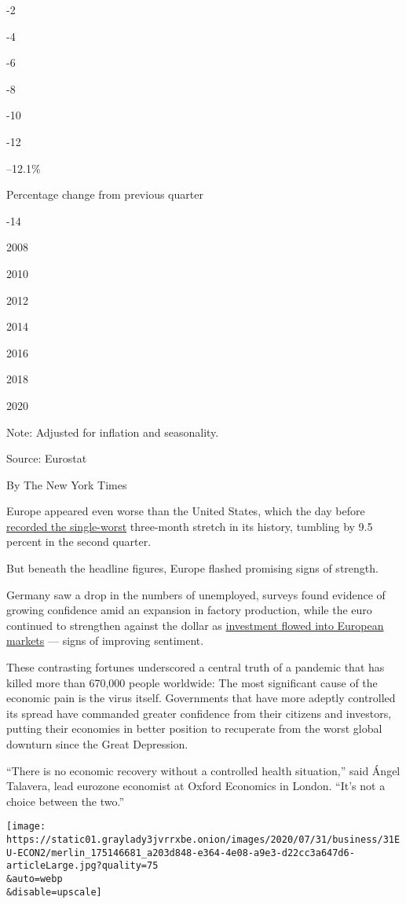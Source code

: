 -2

-4

-6

-8

-10

-12

--12.1\%

Percentage change from previous quarter

-14

2008

2010

2012

2014

2016

2018

2020

Note: Adjusted for inflation and seasonality.

Source: Eurostat

By The New York Times

Europe appeared even worse than the United States, which the day before
\href{https://www.nytimes3xbfgragh.onion/2020/07/30/business/economy/q2-gdp-coronavirus-economy.html?action=click\&module=Top\%20Stories\&pgtype=Homepage}{recorded
the single-worst} three-month stretch in its history, tumbling by 9.5
percent in the second quarter.

But beneath the headline figures, Europe flashed promising signs of
strength.

Germany saw a drop in the numbers of unemployed, surveys found evidence
of growing confidence amid an expansion in factory production, while the
euro continued to strengthen against the dollar as
\href{https://www.nytimes3xbfgragh.onion/2020/07/30/business/europes-markets-are-having-a-moment.html}{investment
flowed into European markets} --- signs of improving sentiment.

These contrasting fortunes underscored a central truth of a pandemic
that has killed more than 670,000 people worldwide: The most significant
cause of the economic pain is the virus itself. Governments that have
more adeptly controlled its spread have commanded greater confidence
from their citizens and investors, putting their economies in better
position to recuperate from the worst global downturn since the Great
Depression.

``There is no economic recovery without a controlled health situation,''
said Ángel Talavera, lead eurozone economist at Oxford Economics in
London. ``It's not a choice between the two.''

\texttt{[image: https://static01.graylady3jvrrxbe.onion/images/2020/07/31/business/31EU-ECON2/merlin\_175146681\_a203d848-e364-4e08-a9e3-d22cc3a647d6-articleLarge.jpg?quality=75\\\&auto=webp\\\&disable=upscale]}

